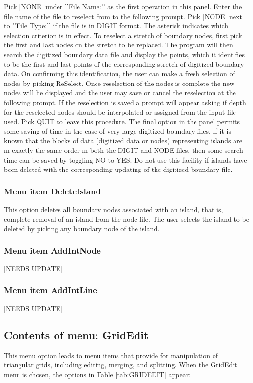 \documentclass{article}
\begin{document}
Pick [NONE] under '{}'File Name:'{}' as the first operation in this panel. Enter the file name of the file to reselect from to the following prompt. Pick [NODE] next to '{}'File Type:'{}' if the file is in DIGIT format. The asterisk indicates which selection criterion is in effect. To reselect a stretch of boundary nodes, first pick the first and last nodes on the stretch to be replaced. The program will then search the digitized boundary data file and display the points, which it identifies to be the first and last points of the corresponding stretch of digitized boundary data. On confirming this identification, the user can make a fresh selection of nodes by picking ReSelect. Once reselection of the nodes is complete the new nodes will be displayed and the user may save or cancel the reselection at the following prompt. If the reselection is saved a prompt will appear asking if depth for the reselected nodes should be interpolated or assigned from the input file used. Pick QUIT to leave this procedure. The 
final option in the panel permits some saving of time in the case of very large digitized boundary files. If it is known that the blocks of data (digitized data or nodes) representing islands are in exactly the same order in both the DIGIT and NODE files, then some search time can be saved by toggling NO to YES. Do not use this facility if islands have been deleted with the corresponding updating of the digitized boundary file.
\\

\subsubsection[Menu item DeleteIsland]{Menu item DeleteIsland}
This option deletes all boundary nodes associated with an island, that is, complete removal of an island from the node file. The user selects the island to be deleted by picking any boundary node of the island.

\subsubsection[Menu item AddIntNode]{Menu item AddIntNode}
[NEEDS UPDATE]

\subsubsection[Menu item AddIntLine]{Menu item AddIntLine}
[NEEDS UPDATE]


\subsection{Contents of menu: GridEdit}
This menu option leads to menu items that provide for manipulation of triangular grids, including editing, merging, and splitting. When the GridEdit menu is chosen, the options in Table \ref{tab:GRIDEDIT} appear:
\end{document}
